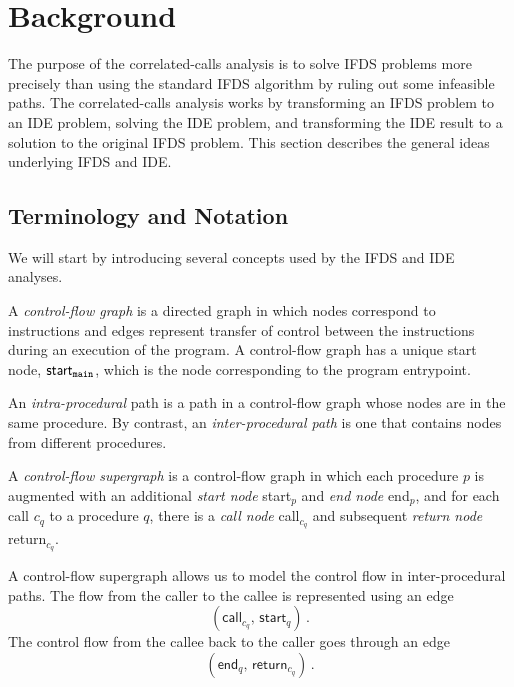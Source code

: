 \section{Background}\label{sec:bg}
The purpose of the correlated-calls analysis is to solve IFDS problems more precisely than using the standard IFDS algorithm by ruling out some infeasible paths. The correlated-calls analysis works by transforming an IFDS problem to an IDE problem, solving the IDE problem, and transforming the IDE result to a solution to the original IFDS problem. This section describes the general ideas underlying IFDS and IDE.

\subsection{Terminology and Notation}
We will start by introducing several concepts used by the IFDS and IDE analyses.

A \textit{control-flow graph} is a directed graph in which nodes correspond to instructions and edges represent transfer of control between the instructions during an execution of the program. 
A control-flow graph has a unique start node, $\textsf{start}_\texttt{main}$, which is the node corresponding to the program entrypoint.

An \textit{intra-procedural} path is a path in a control-flow graph whose nodes are in the same procedure. By contrast, an \textit{inter-procedural path} is one that contains nodes from different procedures. 

A \textit{control-flow supergraph} is a control-flow graph
in which each procedure $p$ is augmented with an additional \textit{start node} \textsf{start}$_p$ and \textit{end node} \textsf{end}$_p$, and for each call $c_q$ to a procedure $q$, there is a \textit{call node} \textsf{call}$_{c_q}$ and subsequent \textit{return node} \textsf{return}$_{c_q}$.

A control-flow supergraph allows us to model the control flow in inter-procedural paths.
 The flow from the caller to the callee is represented using an edge \[(\textsf{call}_{c_q},\,\textsf{start}_q)\,.\] The control flow from the callee back to the caller goes through an edge \[(\textsf{end}_q,\,\textsf{return}_{c_q})\,.\]

